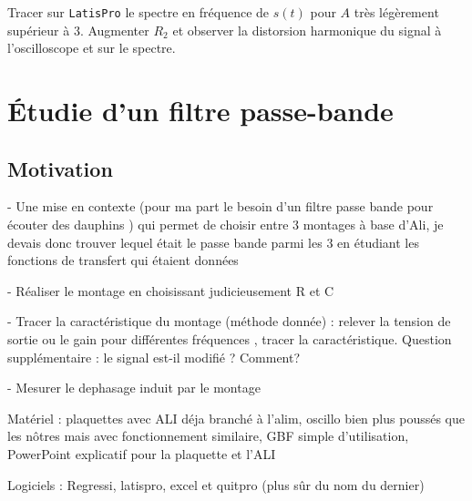 \begin{protocole}
{}
\item Tracer sur \texttt{LatisPro} le spectre en fréquence de $s(t)$ pour $A$ très légèrement supérieur à  $3$. Augmenter $R_2$ et observer la distorsion harmonique du signal à l’oscilloscope et sur le spectre.
\end{protocole}


\section{Étudie d’un filtre passe-bande}

\subsection{Motivation}

- Une mise en contexte (pour ma part le besoin d'un filtre passe bande pour écouter des dauphins ) qui permet de choisir entre 3 montages à base d'Ali, je devais donc trouver lequel était le passe bande parmi les 3 en étudiant les fonctions de transfert qui étaient données

- Réaliser le montage en choisissant judicieusement R et C 

- Tracer la caractéristique du montage (méthode donnée) : relever la tension de sortie ou le gain pour différentes fréquences , tracer la caractéristique. Question supplémentaire : le signal est-il modifié ? Comment?

- Mesurer le dephasage induit par le montage 

Matériel : plaquettes avec ALI déja branché à l'alim, oscillo bien plus poussés que les nôtres mais avec fonctionnement similaire, GBF simple d'utilisation, PowerPoint explicatif pour la plaquette et l'ALI 

Logiciels : Regressi, latispro, excel et quitpro (plus sûr du nom du dernier)



